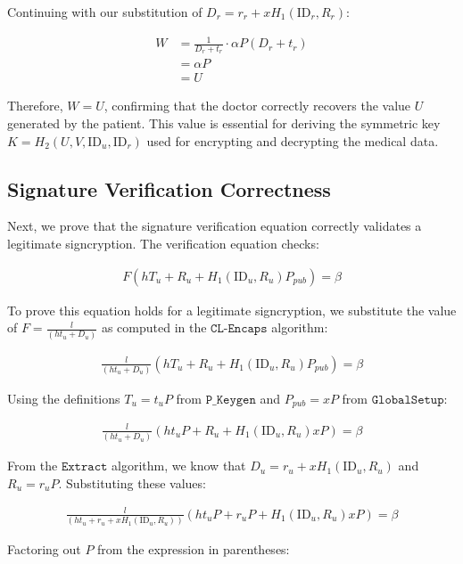 \documentclass[10pt]{article}
\begin{document}
Continuing with our substitution of $D_r = r_r + xH_1(\text{ID}_r,R_r)$:

\begin{align}
W &= \frac{1}{D_r + t_r} \cdot \alpha P(D_r + t_r)\\
&= \alpha P\\
&= U
\end{align}

Therefore, $W = U$, confirming that the doctor correctly recovers the value $U$ generated by the patient. This value is essential for deriving the symmetric key $K = H_2(U,V,\text{ID}_u,\text{ID}_r)$ used for encrypting and decrypting the medical data.

\subsection{Signature Verification Correctness}

Next, we prove that the signature verification equation correctly validates a legitimate signcryption. The verification equation checks:

\begin{align}
F(hT_u + R_u + H_1(\text{ID}_u, R_u)P_{pub}) = \beta
\end{align}

To prove this equation holds for a legitimate signcryption, we substitute the value of $F = \frac{l}{(ht_u+D_u)}$ as computed in the $\texttt{CL-Encaps}$ algorithm:

\begin{align}
\frac{l}{(ht_u+D_u)}(hT_u + R_u + H_1(\text{ID}_u, R_u)P_{pub}) = \beta
\end{align}

Using the definitions $T_u = t_u P$ from $\texttt{P\_Keygen}$ and $P_{pub} = xP$ from $\texttt{GlobalSetup}$:

\begin{align}
\frac{l}{(ht_u+D_u)}(ht_u P + R_u + H_1(\text{ID}_u, R_u)xP) = \beta
\end{align}

From the $\texttt{Extract}$ algorithm, we know that $D_u = r_u + xH_1(\text{ID}_u,R_u)$ and $R_u = r_u P$. Substituting these values:

\begin{align}
\frac{l}{(ht_u+r_u+xH_1(\text{ID}_u,R_u))}(ht_u P + r_u P + H_1(\text{ID}_u, R_u)xP) = \beta
\end{align}

Factoring out $P$ from the expression in parentheses:
\end{document}
